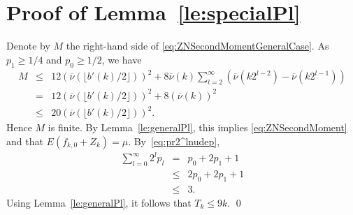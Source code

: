 \documentclass[a4paper,11pt]{article}
\begin{document}
\section{Proof of Lemma~\ref{le:specialPl}}
Denote by \(M\) the right-hand side of \eqref{eq:ZNSecondMomentGeneralCase}. As    \(p_{1}\ge1/4\) and    \(p_{0}\ge1/2\), we have
\begin{eqnarray*}
M
&\le& 12(\overline{\nu}(\lfloor{b'(k)}/{2}\rfloor))^{2}+8\overline{\nu}(k)\sum^{\infty}_{l=2}  (\overline{\nu}(k2^{l-2})-\overline{\nu}(k2^{l-1}))\\
&=&12(\overline{\nu}(\lfloor{b'(k)}/{2}\rfloor))^{2}+8(\overline{\nu}(k))^{2}\\
&\le&20(\overline{\nu}(\lfloor{b'(k)}/{2}\rfloor))^{2}.
\end{eqnarray*}Hence \(M\) is finite. By Lemma~\ref{le:generalPl}, this implies \eqref{eq:ZNSecondMoment} and that  \(E(f_{k,0}+Z_{k})=\mu\).
By~\eqref{eq:pr2^lnudep},
\begin{eqnarray*}
\sum^{\infty}_{l=0}2^{l}p_{l}&=&p_{0}+2p_{1}+1\\&\le&2p_{0}+2p_{1}+1\\&\le&3.\end{eqnarray*}
Using Lemma~\ref{le:generalPl}, it follows that   \(T_{k}\leq9k\).  
\qed
\end{document}

